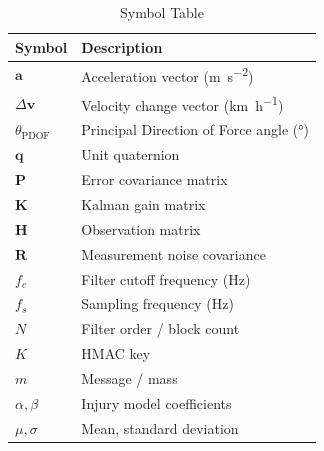 \documentclass[conference,twocolumn]{IEEEtran}
\newcommand{\vect}[1]{\boldsymbol{#1}}
\newcommand{\mat}[1]{\mathbf{#1}}
\begin{document}
\begin{table}[h]
\centering
\caption{Symbol Table}
\label{tab:nomenclature}
\small
\renewcommand{\arraystretch}{1.15}
\begin{tabular}{@{}l l@{}}
\toprule
\textbf{Symbol} & \textbf{Description} \\
\midrule
$\vect{a}$ & Acceleration vector (\si{\meter\per\second\squared}) \\
$\Delta \vect{v}$ & Velocity change vector (\si{\kilo\meter\per\hour}) \\
$\theta_{\text{PDOF}}$ & Principal Direction of Force angle (\si{\degree}) \\
$\vect{q}$ & Unit quaternion \\
$\mat{P}$ & Error covariance matrix \\
$\mat{K}$ & Kalman gain matrix \\
$\mat{H}$ & Observation matrix \\
$\mat{R}$ & Measurement noise covariance \\
$f_c$ & Filter cutoff frequency (\si{\hertz}) \\
$f_s$ & Sampling frequency (\si{\hertz}) \\
$N$ & Filter order / block count \\
$K$ & HMAC key \\
$m$ & Message / mass \\
$\alpha, \beta$ & Injury model coefficients \\
$\mu, \sigma$ & Mean, standard deviation \\
\bottomrule
\end{tabular}
\end{table}
\end{document}
